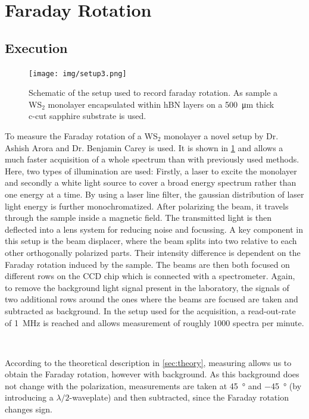 \newpage
\section{Faraday Rotation}

\subsection{Execution} %

\begin{figure}[!ht]
    \centering
    \texttt{[image: img/setup3.png]}
    \caption{Schematic of the setup used to record faraday rotation. As sample a WS$_2$ monolayer encapsulated within hBN layers on a \SI{500}{\micro\meter} thick c-cut sapphire substrate is used.}
    \label{fig_setup3}
\end{figure}
To measure the Faraday rotation of a WS$_2$ monolayer a novel setup by Dr. Ashish Arora and Dr. Benjamin Carey is used.
It is shown in \cref{fig_setup3} and allows a much faster acquisition of a whole spectrum than with previously used methods.
Here, two types of illumination are used:
Firstly, a laser to excite the monolayer and secondly a white light source to cover a broad energy spectrum rather than one energy at a time.
By using a laser line filter, the gaussian distribution of laser light energy is further monochromatized.
After polarizing the beam, it travels through the sample inside a magnetic field.
The transmitted light is then deflected into a lens system for reducing noise and focussing.
A key component in this setup is the beam displacer, where the beam splits into two relative to each other orthogonally polarized parts.
Their intensity difference is dependent on the Faraday rotation induced by the sample.
The beams are then both focused on different rows on the CCD chip which is connected with a spectrometer.
Again, to remove the background light signal present in the laboratory, the signals of two additional rows around the ones where the beams are focused are taken and subtracted as background.
In the setup used for the acquisition, a read-out-rate of \SI{1}{\mega\hertz} is reached and allows measurement of roughly $1000$ spectra per minute.

\

According to the theoretical description in \cref{sec:theory}, measuring allows us to obtain the Faraday rotation, however with background.
As this background does not change with the polarization, measurements are taken at \SI{+45}{\degree} and \SI{-45}{\degree} (by introducing a $\lambda/2$-waveplate) and then subtracted, since the Faraday rotation changes sign.

